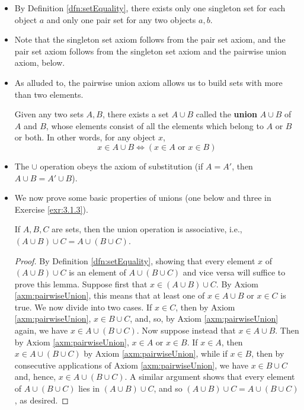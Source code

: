 \documentclass[../main.tex]{subfiles}
\begin{document}
\begin{itemize}
\begin{axm}
    \end{axm}
    \item By Definition \ref{dfn:setEquality}, there exists only one singleton set for each object $a$ and only one pair set for any two objects $a,b$.
    \item Note that the singleton set axiom follows from the pair set axiom, and the pair set axiom follows from the singleton set axiom and the pairwise union axiom, below.
    \item As alluded to, the pairwise union axiom allows us to build sets with more than two elements.
    \begin{axm}\label{axm:pairwiseUnion}
        Given any two sets $A,B$, there exists a set $A\cup B$ called the \textbf{union} $A\cup B$ of $A$ and $B$, whose elements consist of all the elements which belong to $A$ or $B$ or both. In other words, for any object $x$,
        \begin{equation*}
            x\in A\cup B \Longleftrightarrow (x\in A\text{ or }x\in B)
        \end{equation*}
    \end{axm}
    \item The $\cup$ operation obeys the axiom of substitution (if $A=A'$, then $A\cup B=A'\cup B$).
    \item We now prove some basic properties of unions (one below and three in Exercise \ref{exr:3.1.3}).
    \begin{lem}\label{lem:associativitySetUnion}
        If $A,B,C$ are sets, then the union operation is associative, i.e., $(A\cup B)\cup C=A\cup(B\cup C)$.
        \begin{proof}
            By Definition \ref{dfn:setEquality}, showing that every element $x$ of $(A\cup B)\cup C$ is an element of $A\cup(B\cup C)$ and vice versa will suffice to prove this lemma. Suppose first that $x\in(A\cup B)\cup C$. By Axiom \ref{axm:pairwiseUnion}, this means that at least one of $x\in A\cup B$ or $x\in C$ is true. We now divide into two cases. If $x\in C$, then by Axiom \ref{axm:pairwiseUnion}, $x\in B\cup C$, and, so, by Axiom \ref{axm:pairwiseUnion} again, we have $x\in A\cup(B\cup C)$. Now suppose instead that $x\in A\cup B$. Then by Axiom \ref{axm:pairwiseUnion}, $x\in A$ or $x\in B$. If $x\in A$, then $x\in A\cup(B\cup C)$ by Axiom \ref{axm:pairwiseUnion}, while if $x\in B$, then by consecutive applications of Axiom \ref{axm:pairwiseUnion}, we have $x\in B\cup C$ and, hence, $x\in A\cup (B\cup C)$. A similar argument shows that every element of $A\cup(B\cup C)$ lies in $(A\cup B)\cup C$, and so $(A\cup B)\cup C=A\cup(B\cup C)$, as desired.

\end{proof}
\end{lem}
\end{itemize}
\end{document}
